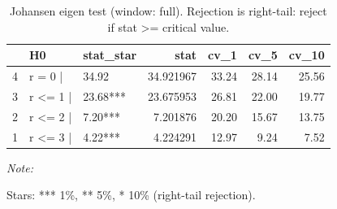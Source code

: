 \begin{table}[!h]
\centering
\caption{Johansen eigen test (window: full). Rejection is right-tail: reject if stat >= critical value.}
\centering
\begin{threeparttable}
\begin{tabular}[t]{lllrrrr}
\toprule
  & H0 & stat\_star & stat & cv\_1 & cv\_5 & cv\_10\\
\midrule
4 & r = 0  | & 34.92 & 34.921967 & 33.24 & 28.14 & 25.56\\
3 & r <= 1 | & 23.68*** & 23.675953 & 26.81 & 22.00 & 19.77\\
2 & r <= 2 | & 7.20*** & 7.201876 & 20.20 & 15.67 & 13.75\\
1 & r <= 3 | & 4.22*** & 4.224291 & 12.97 & 9.24 & 7.52\\
\bottomrule
\end{tabular}
\begin{tablenotes}
\item \textit{Note: } 
\item Stars: *** 1\%, ** 5\%, * 10\% (right-tail rejection).
\end{tablenotes}
\end{threeparttable}
\end{table}
